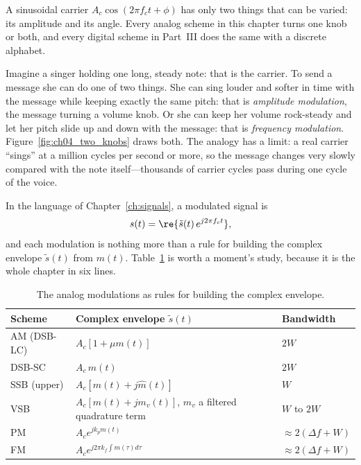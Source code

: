A sinusoidal carrier $A_c\cos(2\pi f_c t+\phi)$ has only two things that can be varied: its amplitude
and its angle. Every analog scheme in this chapter turns one knob or both, and every digital scheme in
Part~III does the same with a discrete alphabet.

\begin{analogy}
Imagine a singer holding one long, steady note: that is the carrier. To send a message she can do one
of two things. She can sing louder and softer in time with the message while keeping exactly the same
pitch: that is \emph{amplitude modulation}, the message turning a volume knob. Or she can keep her
volume rock-steady and let her pitch slide up and down with the message: that is \emph{frequency
modulation}. Figure~\ref{fig:ch04_two_knobs} draws both. The analogy has a limit: a real carrier
``sings'' at a million cycles per second or more, so the message changes very slowly compared with the
note itself---thousands of carrier cycles pass during one cycle of the voice.
\end{analogy}


In the language of Chapter~\ref{ch:signals}, a modulated signal is
\begin{equation}
s(t)=\re\{\tilde{s}(t)\,e^{j2\pi f_c t}\},
\label{eq:ch04:env}
\end{equation}
and each modulation is nothing more than a rule for building the complex envelope $\tilde{s}(t)$ from
$m(t)$. Table~\ref{tab:ch04:envelopes} is worth a moment's study, because it is the whole chapter in six
lines.

\begin{table}[htbp]\centering\small
\caption{The analog modulations as rules for building the complex envelope.}
\label{tab:ch04:envelopes}
\begin{tabular}{lll}
\toprule
Scheme & Complex envelope $\tilde s(t)$ & Bandwidth \\
\midrule
AM (DSB-LC) & $A_c[1+\mu m(t)]$ & $2W$ \\
DSB-SC & $A_c\,m(t)$ & $2W$ \\
SSB (upper) & $A_c[m(t)+j\hat m(t)]$ & $W$ \\
VSB & $A_c[m(t)+j m_v(t)]$, $m_v$ a filtered quadrature term & $W$ to $2W$ \\
PM & $A_c e^{jk_p m(t)}$ & $\approx 2(\Delta f+W)$ \\
FM & $A_c e^{j2\pi k_f\int m(\tau)d\tau}$ & $\approx 2(\Delta f+W)$ \\
\bottomrule
\end{tabular}
\end{table}

